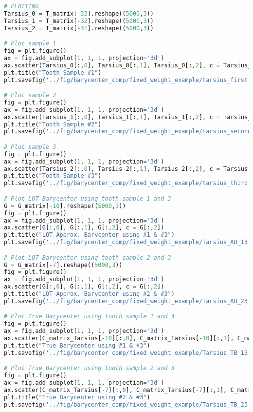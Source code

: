 \begin{lstlisting}[language=Python, caption=Code for barycenter generation., label={code:barycenter}]
# PLOTTING
Tarsius_0 = T_matrix[-33].reshape((5000,3))
Tarsius_1 = T_matrix[-32].reshape((5000,3))
Tarsius_2 = T_matrix[-31].reshape((5000,3))

# Plot sample 1
fig = plt.figure()
ax = fig.add_subplot(1, 1, 1, projection='3d')
ax.scatter(Tarsius_0[:,0], Tarsius_0[:,1], Tarsius_0[:,2], c = Tarsius_0[:,2])
plt.title("Tooth Sample #1")
plt.savefig('../fig/barycenter_comp/fixed_weight_example/tarsius_first.png')

# Plot sample 2
fig = plt.figure()
ax = fig.add_subplot(1, 1, 1, projection='3d')
ax.scatter(Tarsius_1[:,0], Tarsius_1[:,1], Tarsius_1[:,2], c = Tarsius_1[:,2])
plt.title("Tooth Sample #2")
plt.savefig('../fig/barycenter_comp/fixed_weight_example/tarsius_second.png')

# Plot sample 3
fig = plt.figure()
ax = fig.add_subplot(1, 1, 1, projection='3d')
ax.scatter(Tarsius_2[:,0], Tarsius_2[:,1], Tarsius_2[:,2], c = Tarsius_2[:,2])
plt.title("Tooth Sample #3")
plt.savefig('../fig/barycenter_comp/fixed_weight_example/tarsius_third.png')

# Plot LOT Barycenter using tooth sample 1 and 3
G = G_matrix[-10].reshape((5000,3))
fig = plt.figure()
ax = fig.add_subplot(1, 1, 1, projection='3d')
ax.scatter(G[:,0], G[:,1], G[:,2], c = G[:,2])
plt.title("LOT Approx. Barycenter using #1 & #3")
plt.savefig('../fig/barycenter_comp/fixed_weight_example/Tarsius_AB_13.png')

# Plot LOT Barycenter using tooth sample 2 and 3
G = G_matrix[-7].reshape((5000,3))
fig = plt.figure()
ax = fig.add_subplot(1, 1, 1, projection='3d')
ax.scatter(G[:,0], G[:,1], G[:,2], c = G[:,2])
plt.title("LOT Approx. Barycenter using #2 & #3")
plt.savefig('../fig/barycenter_comp/fixed_weight_example/Tarsius_AB_23.png')

# Plot True Barycenter using tooth sample 1 and 3
fig = plt.figure()
ax = fig.add_subplot(1, 1, 1, projection='3d')
ax.scatter(C_matrix_Tarsius[-10][:,0], C_matrix_Tarsius[-10][:,1], C_matrix_Tarsius[-10][:,2], c = C_matrix_Tarsius[-10][:,2])
plt.title("True Barycenter using #1 & #3")
plt.savefig('../fig/barycenter_comp/fixed_weight_example/Tarsius_TB_13.png')

# Plot True Barycenter using tooth sample 2 and 3
fig = plt.figure()
ax = fig.add_subplot(1, 1, 1, projection='3d')
ax.scatter(C_matrix_Tarsius[-7][:,0], C_matrix_Tarsius[-7][:,1], C_matrix_Tarsius[-7][:,2], c = C_matrix_Tarsius[-7][:,2])
plt.title("True Barycenter using #2 & #3")
plt.savefig('../fig/barycenter_comp/fixed_weight_example/Tarsius_TB_23.png')


\end{lstlisting}





